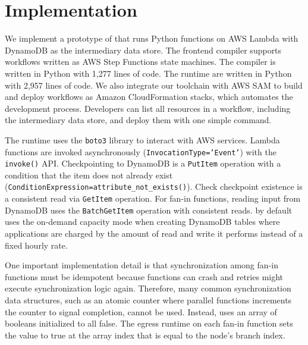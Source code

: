 \section{Implementation}\label{sec:impl}

We implement a prototype of \name{} that runs Python functions on AWS Lambda
with DynamoDB as the intermediary data store. The frontend compiler
supports workflows written as AWS Step Functions state machines. The compiler
is written in Python with 1,277 lines of code.
The runtime are written in Python with 2,957 lines of code. We also integrate
our toolchain with AWS SAM to build and deploy \name{} workflows as Amazon
CloudFormation stacks, which automates the development process. Developers can
list all resources in a workflow, including the intermediary data store, and
deploy them with one simple command.

The runtime uses the \texttt{boto3} library to interact with AWS services.
Lambda functions are invoked asynchronously (\texttt{InvocationType='Event'})
with the \texttt{invoke()} API. Checkpointing to DynamoDB is a
\texttt{PutItem} operation with a condition that the item does not already
exist (\texttt{ConditionExpression=attribute\_not\_exists()}). Check
checkpoint existence is a consistent read via \texttt{GetItem} operation. For
fan-in functions, reading input from DynamoDB uses the \texttt{BatchGetItem}
operation with consistent reads.
\name{} by default uses the on-demand capacity mode when creating DynamoDB
tables where applications are charged by the amount of read and write it
performs instead of a fixed hourly rate.

One important implementation detail is that synchronization among fan-in
functions must be idempotent because functions can crash and retries might
execute synchronization logic again. Therefore, many common synchronization
data structures, such as an atomic counter where parallel functions increments
the counter to signal completion, cannot be used. Instead, \name{} uses an
array of booleans initialized to all false. The egress runtime on each fan-in
function sets the value to true at the array index that is equal to the node's
branch index.
